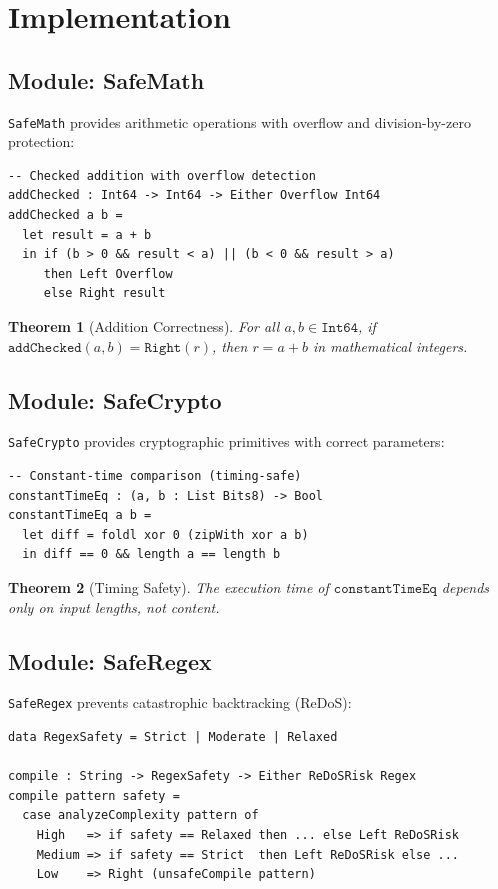 \documentclass[11pt,a4paper]{article}
\newtheorem{theorem}{Theorem}[section]
\begin{document}
\section{Implementation}

\subsection{Module: SafeMath}

\texttt{SafeMath} provides arithmetic operations with overflow and division-by-zero protection:

\begin{lstlisting}
-- Checked addition with overflow detection
addChecked : Int64 -> Int64 -> Either Overflow Int64
addChecked a b =
  let result = a + b
  in if (b > 0 && result < a) || (b < 0 && result > a)
     then Left Overflow
     else Right result
\end{lstlisting}

\begin{theorem}[Addition Correctness]
For all $a, b \in \mathtt{Int64}$, if $\mathtt{addChecked}(a, b) = \mathtt{Right}(r)$, then $r = a + b$ in mathematical integers.
\end{theorem}

\subsection{Module: SafeCrypto}

\texttt{SafeCrypto} provides cryptographic primitives with correct parameters:

\begin{lstlisting}
-- Constant-time comparison (timing-safe)
constantTimeEq : (a, b : List Bits8) -> Bool
constantTimeEq a b =
  let diff = foldl xor 0 (zipWith xor a b)
  in diff == 0 && length a == length b
\end{lstlisting}

\begin{theorem}[Timing Safety]
The execution time of $\mathtt{constantTimeEq}$ depends only on input lengths, not content.
\end{theorem}

\subsection{Module: SafeRegex}

\texttt{SafeRegex} prevents catastrophic backtracking (ReDoS):

\begin{lstlisting}
data RegexSafety = Strict | Moderate | Relaxed

compile : String -> RegexSafety -> Either ReDoSRisk Regex
compile pattern safety =
  case analyzeComplexity pattern of
    High   => if safety == Relaxed then ... else Left ReDoSRisk
    Medium => if safety == Strict  then Left ReDoSRisk else ...
    Low    => Right (unsafeCompile pattern)
\end{lstlisting}
\end{document}
